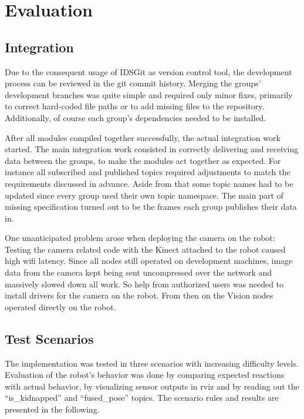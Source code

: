 \chapter{Evaluation}
\label{Evaluation chapter}
\section{Integration}
Due to the consequent usage of IDSGit as version control tool, the development process can be reviewed in the git commit history. Merging the groups' development branches was quite simple and required only minor fixes, primarily to correct hard-coded file paths or to add missing files to the repository. Additionally, of course each group's dependencies needed to be installed.

After all modules compiled together successfully, the actual integration work started. The main integration work consisted in correctly delivering and receiving data between the groups, to make the modules act together as expected. For instance all subscribed and published topics required adjustments to match the requirements discussed in advance. Aside from that some topic names had to be updated since every group used their own topic namespace. The main part of missing specification turned out to be the frames each group publishes their data in.

One unanticipated problem arose when deploying the camera on the robot: Testing the camera related code with the Kinect attached to the robot caused high wifi latency. Since all nodes still operated on development machines, image data from the camera kept being sent uncompressed over the network and massively slowed down all work. So help from authorized users was needed to install drivers for the camera on the robot. From then on the Vision nodes operated directly on the robot.

\section{Test Scenarios}
The implementation was tested in three scenarios with increasing difficulty levels. Evaluation of the robot's behavior was done by comparing expected reactions with actual behavior, by visualizing sensor outputs in rviz and by reading out the ``is\_kidnapped'' and ``fused\_pose'' topics. The scenario rules and results are presented in the following.

